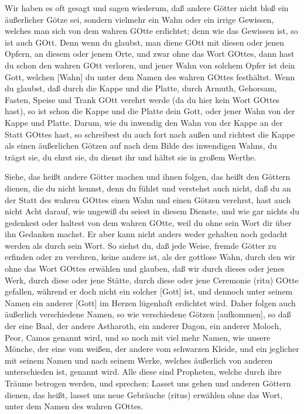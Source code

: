 Wir haben es oft gesagt und sagen wiederum, daß andere Götter nicht bloß ein äußerlicher Götze sei, sondern vielmehr ein Wahn oder ein irrige Gewissen, welches man sich von dem wahren GOtte erdichtet; denn wie das Gewissen ist, so ist auch GOtt. Denn wenn du glaubst, man diene GOtt mit diesen oder jenen Opfern, an diesem oder jenem Orte, und zwar ohne das Wort GOttes, dann hast du schon den wahren GOtt verloren, und jener Wahn von solchem Opfer ist dein Gott, welchen [Wahn] du unter dem Namen des wahren GOttes festhältst. Wenn du glaubst, daß durch die Kappe und die Platte, durch Armuth, Gehorsam, Fasten, Speise und Trank GOtt verehrt werde (da du hier kein Wort GOttes hast), so ist schon die Kappe und die Platte dein Gott, oder jener Wahn von der Kappe und Platte. Darum, wie du inwendig den Wahn von der Kappe an der Statt GOttes hast, so schreibest du auch fort nach außen und richtest die Kappe als einen äußerlichen Götzen auf nach dem Bilde des inwendigen Wahns, du trägst sie, du ehrst sie, du dienst ihr und hältst sie in großem Werthe.

Siehe, das heißt andere Götter machen und ihnen folgen, das heißt den Göttern dienen, die du nicht kennst, denn du fühlst und verstehst auch nicht, daß du an der Statt des wahren GOttes einen Wahn und einen Götzen verehrst, hast auch nicht Acht darauf, wie ungewiß du seiest in diesem Dienste, und wie gar nichts du gedenkest oder haltest von dem wahren GOtte, weil du ohne sein Wort dir über ihn Gedanken machst. Er aber kann nicht anders weder gehalten noch gedacht werden als durch sein Wort. So siehst du, daß jede Weise, fremde Götter zu erfinden oder zu verehren, keine andere ist, als der gottlose Wahn, durch den wir ohne das Wort GOttes erwählen und glauben, daß wir durch dieses oder jenes Werk, durch diese oder jene Stätte, durch diese oder jene Ceremonie (ritu) GOtte gefallen, während er doch nicht ein solcher [Gott] ist, und dennoch unter seinem Namen ein anderer [Gott] im Herzen lügenhaft erdichtet wird. Daher folgen auch äußerlich verschiedene Namen, so wie
verschiedene Götzen [aufkommen], so daß der eine Baal, der andere Astharoth, ein anderer Dagon, ein anderer Moloch, Peor, Camos genannt wird, und so noch mit viel mehr Namen, wie unsere Mönche, der eine vom weißen, der andere vom schwarzen Kleide, und ein jeglicher mit seinem Namen und nach seinem Werke, welches äußerlich von anderen unterschieden ist, genannt wird. Alle diese sind Propheten, welche durch ihre Träume betrogen werden, und sprechen: Lasset uns gehen und anderen Göttern dienen, das heißt, lasset uns neue Gebräuche (ritus) erwählen ohne das Wort, unter dem Namen des wahren GOttes.


